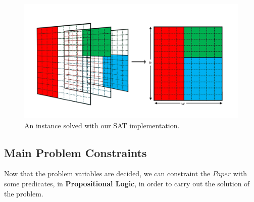 \begin{figure}[ht]
	\centering
	\includegraphics[width=\textwidth]{images/SAT_cube.png}
	\caption{An instance solved with our SAT implementation.}
	\label{fig:overlaps}
\end{figure}

\subsection{Main Problem Constraints}
Now that the problem variables are decided, we can constraint the $Paper$ with some predicates, in \textbf{Propositional Logic}, in order
to carry out the solution of the problem.

